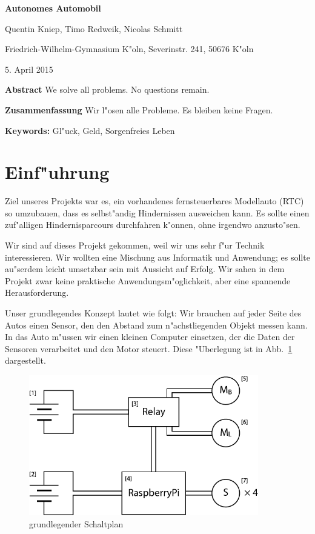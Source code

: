 \documentclass[a4paper,12pt]{article}
\begin{document}
{\Large\bf Autonomes Automobil}

\medskip

Quentin Kniep, Timo Redweik, Nicolas Schmitt

\medskip

Friedrich-Wilhelm-Gymnasium K"oln, Severinstr. 241, 50676 K"oln

\medskip

5. April  2015

\medskip

{\bf  Abstract}
{\small We solve all problems. No questions remain.}

\medskip

{\bf  Zusammenfassung}
{\small Wir l"osen alle Probleme. Es bleiben keine Fragen.}

\medskip

{\bf  Keywords:}
{\small Gl"uck, Geld, Sorgenfreies Leben}

\bigskip


\section{Einf"uhrung}\label{sec1}

Ziel unseres Projekts war es, ein vorhandenes fernsteuerbares Modellauto (RTC) so umzubauen, dass es selbst"andig Hindernissen ausweichen kann.
Es sollte einen zuf"alligen Hindernisparcours durchfahren k"onnen, ohne irgendwo anzusto"sen.

Wir sind auf dieses Projekt gekommen, weil wir uns sehr f"ur Technik interessieren.
Wir wollten eine Mischung aus Informatik und Anwendung; es sollte au"serdem leicht umsetzbar sein mit Aussicht auf Erfolg.
Wir sahen in dem Projekt zwar keine praktische Anwendungsm"oglichkeit, aber eine spannende Herausforderung.

Unser grundlegendes Konzept lautet wie folgt:
Wir brauchen auf jeder Seite des Autos einen Sensor, den den Abstand zum n"achstliegenden Objekt messen kann.
In das Auto m"ussen wir einen kleinen Computer einsetzen, der die Daten der Sensoren verarbeitet und den Motor steuert.
Diese "Uberlegung ist in Abb.~\ref{Fig1} dargestellt.

\begin{figure}[h]
	\centering
	\includegraphics[width=10cm]{./media/circuit_general.png}
	\caption{grundlegender Schaltplan}
	\label{Fig1}
\end{figure}
\end{document}
